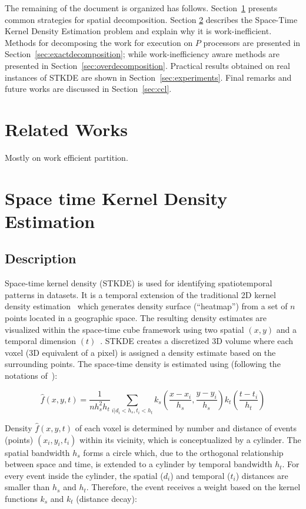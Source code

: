 \documentclass[10pt, conference, compsocconf]{IEEEtran}
\begin{document}
The remaining of the document is organized has follows.
Section~\ref{sec:relworks} presents common strategies for spatial
decomposition. Section \ref{sec:stkde} describes the Space-Time Kernel
Density Estimation problem and explain why it is
work-inefficient. Methods for decomposing the work for execution on
$P$ processors are presented in Section~\ref{sec:exactdecomposition};
while work-inefficiency aware methods are presented in
Section~\ref{sec:overdecomposition}. Practical results obtained on
real instances of STKDE are shown in
Section~\ref{sec:experiments}. Final remarks and future works are
discussed in Section~\ref{sec:ccl}.

\section{Related Works}
\label{sec:relworks}

Mostly on work efficient partition.

\section{Space time Kernel Density Estimation}
\label{sec:stkde}

\subsection{Description}

Space-time kernel density (STKDE) is used for identifying
spatiotemporal patterns in datasets. It is a temporal
extension of the traditional 2D kernel density
estimation~\cite{Silverman86} which generates density surface
(``heatmap'') from a set of $n$ points located in a geographic space. The resulting density
estimates are visualized within the space-time cube framework using two spatial $(x,
y)$ and a temporal dimension $(t)$~\cite{Nakaya10}. STKDE creates a discretized 3D
 volume where each voxel (3D equivalent of a pixel) is assigned a
density estimate based on the surrounding points. The space-time
density is estimated using (following the notations
of~\cite{Hohl16}):

$$ \hat{f} (x, y, t) = \frac{1}{n h_s^2 h_t} \sum_{i | d_i < h_s, t_i<h_t}
k_s (\frac{x-x_i}{h_s},\frac{y-y_i}{h_s}) k_t(\frac{t-t_i}{h_t})$$

Density $\hat{f} (x, y, t)$ of each voxel is determined by number and distance of events (points)
$(x_i, y_i, t_i)$ within its vicinity, which is conceptualized by a
cylinder. The spatial bandwidth $h_s$ forms a circle which, due to the
orthogonal relationship between space and time, is extended to a
cylinder by temporal bandwidth $h_t$. For every event inside the
cylinder, the spatial ($d_i$) and temporal ($t_i$) distances are smaller
than $h_s$ and $h_t$. Therefore, the event receives a weight based on the
kernel functions $k_s$ and $k_t$ (distance decay):
\end{document}
